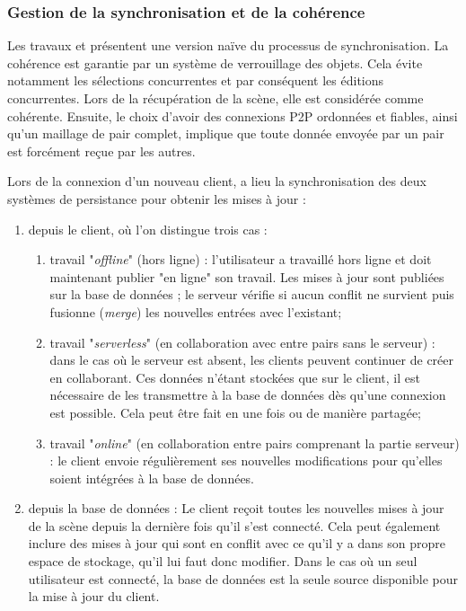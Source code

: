 \subsubsection{Gestion de la synchronisation et de la cohérence}
\label{sec:synchronisation-client-serveur}

Les travaux \cite{Desprat2015a} et \cite{Desprat2015b} présentent une version 
naïve du processus de synchronisation. La cohérence est garantie par un système 
de verrouillage des objets. Cela évite notamment les sélections concurrentes et par 
conséquent les éditions concurrentes. 
Lors de la récupération de la scène, elle est considérée comme cohérente. 
Ensuite, le choix d'avoir des connexions \gls{P2P} ordonnées et fiables, ainsi qu'un 
maillage de pair complet, implique que toute donnée envoyée par un pair est 
forcément reçue par les autres. 

Lors de la connexion d'un nouveau client, a lieu la synchronisation des deux 
systèmes de persistance pour obtenir les mises à jour : 
\begin{enumerate}
	\item depuis le client, où l'on distingue trois cas :
	\begin{enumerate}
		\item travail "\textit{offline}" (hors ligne) : l'utilisateur a travaillé hors ligne et 
		doit maintenant publier "en ligne" son travail. Les mises à jour sont publiées sur la 
		base de données ; le serveur vérifie si aucun conflit ne survient puis 
		fusionne (\textit{merge}) les nouvelles entrées avec l'existant; 
		
		\item travail "\textit{serverless}" (en collaboration avec entre pairs sans le 
		serveur) : dans le cas où le serveur est absent, les clients peuvent continuer 
		de créer en collaborant. Ces données n'étant stockées que sur le client, il est 
		nécessaire de les transmettre à la base de données dès qu'une connexion 
		est possible. 
		Cela peut être fait en une fois ou de manière partagée;
		
		\item travail "\textit{online}" (en collaboration entre pairs comprenant la partie
		serveur) : le client envoie régulièrement  ses 
		nouvelles modifications pour qu'elles soient intégrées à la base de données.
	\end{enumerate}
	\item depuis la base de données :
	Le client reçoit toutes les nouvelles mises à jour de la scène depuis la dernière 
	fois qu'il s'est connecté. Cela peut également inclure des mises à jour qui sont 
	en conflit avec ce qu'il y a dans son propre espace de stockage, qu'il lui faut 
	donc modifier.
	Dans le cas où un seul utilisateur est connecté, la base de données est la 
	seule source disponible pour la mise à jour du client. 
\end{enumerate}


